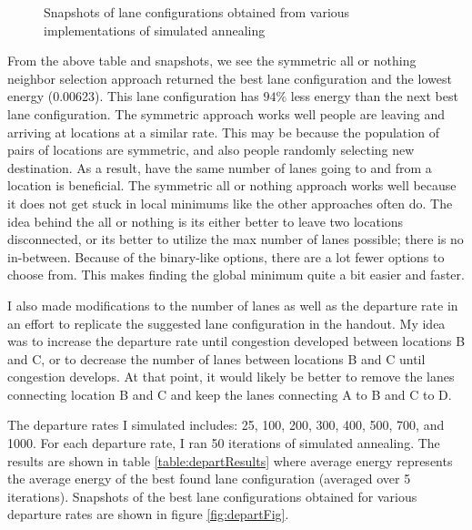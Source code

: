 \documentclass[11pt]{article}
\begin{document}
\begin{figure}[H]
    \qquad
    \caption{Snapshots of lane configurations obtained from various implementations of simulated annealing}%
    \label{fig:neighbor}%
\end{figure}
From the above table and snapshots, we see the symmetric all or nothing neighbor selection approach returned the best lane configuration and the lowest energy (0.00623). This lane configuration has $94\%$ less energy than the next best lane configuration. The symmetric approach works well people are leaving and arriving at locations at a similar rate. This may be because the population of pairs of locations are symmetric, and also people randomly selecting new destination. As a result, have the same number of lanes going to and from a location is beneficial. The symmetric all or nothing approach works well because it does not get stuck in local minimums like the other approaches often do. The idea behind the all or nothing is its either better to leave two locations disconnected, or its better to utilize the max number of lanes possible; there is no in-between. Because of the binary-like options, there are a lot fewer options to choose from. This makes finding the global minimum quite a bit easier and faster.

I also made modifications to the number of lanes as well as the departure rate in an effort to replicate the suggested lane configuration in the handout. My idea was to increase the departure rate until congestion developed between locations B and C, or to decrease the number of lanes between locations B and C until congestion develops. At that point, it would likely be better to remove the lanes connecting location B and C and keep the lanes connecting A to B and C to D.

The departure rates I simulated includes: 25, 100, 200, 300, 400, 500, 700, and 1000. For each departure rate, I ran 50 iterations of simulated annealing. The results are shown in table \ref{table:departResults} where average energy represents the average energy of the best found lane configuration (averaged over 5 iterations). Snapshots of the best lane configurations obtained for various departure rates are shown in figure \ref{fig:departFig}.
\end{document}
